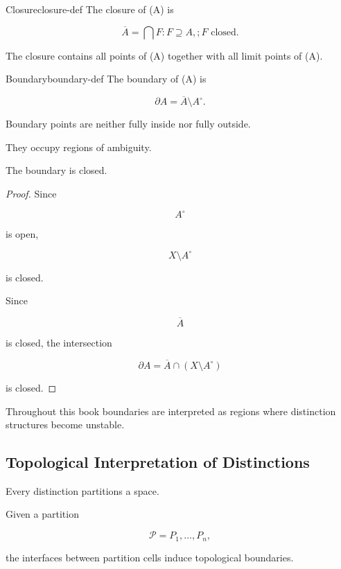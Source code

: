 \documentclass[12pt,twoside,openright]{book}
\newenvironment{prop}
{\begin{proposition}{}{}}
{\end{proposition}}
\begin{document}
\begin{definition}{Closure}{closure-def}
The closure of (A) is

\[
\overline A
=

\bigcap
{F:F\supseteq A,;F\text{ closed}}.
\]
\end{definition}

The closure contains all points of (A) together with all
limit points of (A).

\begin{definition}{Boundary}{boundary-def}
The boundary of (A) is

\[
\partial A
=

\overline A
\setminus
A^\circ.
\]
\end{definition}

Boundary points are neither fully inside nor fully
outside.

They occupy regions of ambiguity.

\begin{prop}
The boundary is closed.
\end{prop}

\begin{proof}
Since

\[
A^\circ
\]

is open,

\[
X\setminus A^\circ
\]

is closed.

Since

\[
\overline A
\]

is closed, the intersection

\[
\partial A
=

\overline A
\cap
(X\setminus A^\circ)
\]

is closed.
\end{proof}

Throughout this book boundaries are interpreted as regions
where distinction structures become unstable.

\subsection{Topological Interpretation of Distinctions}

Every distinction partitions a space.

Given a partition

\[
\mathcal P
=

{P_1,\ldots,P_n},
\]

the interfaces between partition cells induce
topological boundaries.
\end{document}
